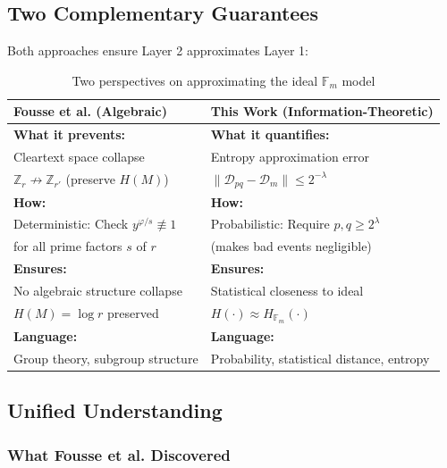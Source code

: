 \documentclass[11pt]{article}
\theoremstyle{definition}
\begin{document}
\subsection{Two Complementary Guarantees}

Both approaches ensure Layer 2 approximates Layer 1:

\begin{table}[h]
\centering
\begin{tabular}{@{}p{}p{}@{}}
\toprule
\textbf{Fousse et al. (Algebraic)} & \textbf{This Work (Information-Theoretic)} \\ 
\midrule
\textbf{What it prevents:} & \textbf{What it quantifies:} \\
Cleartext space collapse & Entropy approximation error \\
$\mathbb{Z}_r \not\to \mathbb{Z}_{r'}$ (preserve $H(M)$) & $\|\mathcal{D}_{pq} - \mathcal{D}_m\| \leq 2^{-\lambda}$ \\[0.5em]

\textbf{How:} & \textbf{How:} \\
Deterministic: Check $y^{\varphi/s} \not\equiv 1$ & Probabilistic: Require $p, q \geq 2^\lambda$ \\
for all prime factors $s$ of $r$ & (makes bad events negligible) \\[0.5em]

\textbf{Ensures:} & \textbf{Ensures:} \\
No algebraic structure collapse & Statistical closeness to ideal \\
$H(M) = \log r$ preserved & $H(\cdot) \approx H_{\mathbb{F}_m}(\cdot)$ \\[0.5em]

\textbf{Language:} & \textbf{Language:} \\
Group theory, subgroup structure & Probability, statistical distance, entropy \\
\bottomrule
\end{tabular}
\caption{Two perspectives on approximating the ideal $\mathbb{F}_m$ model}
\end{table}

\subsection{Unified Understanding}

\subsubsection{What Fousse et al. Discovered}
\end{document}
